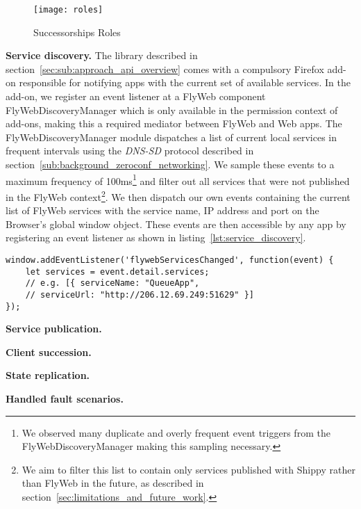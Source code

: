 \begin{figure}[h]
    \centering
    \texttt{[image: roles]}
    \caption{Successorships Roles}
    \label{fig:roles}
\end{figure}

\noindent\textbf{Service discovery.} 
The \APIshort library described in section~\ref{sec:sub:approach_api_overview} comes with a compulsory Firefox add-on responsible for notifying apps with the current set of available \APIshort services. 
In the add-on, we register an event listener at a FlyWeb component {\ttfamily FlyWebDiscoveryManager} which is only available in the permission context of add-ons, making this a required mediator between FlyWeb and \APIshort Web apps. 
The {\ttfamily FlyWebDiscoveryManager} module dispatches a list of current local services in frequent intervals using the \textit{DNS-SD} protocol described in section~\ref{sub:background_zeroconf_networking}.
We sample these events to a maximum frequency of 100ms\footnote{We observed many duplicate and overly frequent event triggers from the {\ttfamily FlyWebDiscoveryManager} making this sampling necessary.} and filter out all services that were not published in the FlyWeb context\footnote{We aim to filter this list to contain only services published with Shippy rather than FlyWeb in the future, as described in section~\ref{sec:limitations_and_future_work}.}. We then dispatch our own events containing the current list of FlyWeb services with the service name, IP address and port on the Browser's global {\ttfamily window} object. 
These events are then accessible by any \APIshort app by registering an event listener as shown in listing~\ref{lst:service_discovery}.

\begin{lstlisting}[caption={Event listener for service discovery},label={lst:service_discovery}]
window.addEventListener('flywebServicesChanged', function(event) {
    let services = event.detail.services;
    // e.g. [{ serviceName: "QueueApp",
    // serviceUrl: "http://206.12.69.249:51629" }]
});
\end{lstlisting}

\noindent\textbf{Service publication.}

\noindent\textbf{Client succession.}

\noindent\textbf{State replication.}

\noindent\textbf{Handled fault scenarios.}


